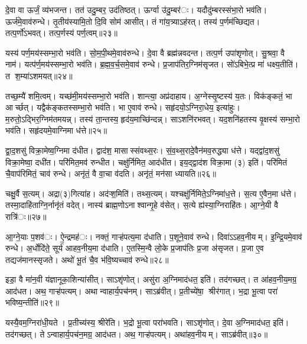 दे॒वा वा ऊर्जं॒ व्य॑भजन्त। तत॑ उदु॒म्बर॒ उद॑तिष्ठत्। ऊर्ग्वा उ॑दु॒म्बर॑ः। यदौदु॑म्बरस्संभा॒रो भव॑ति। ऊर्ज॑मे॒वाव॑रुन्धे। तृ॒तीय॑स्यामि॒तो दि॒वि सोम॑ आसीत्। तं गा॑य॒त्र्याऽह॑रत्। तस्य॑ प॒र्णम॑च्छिद्यत। तत्प॒र्णो॑ऽभवत्। तत्प॒र्णस्य॑ पर्ण॒त्वम्॥२३॥

यस्य॑ पर्ण॒मय॑स्सम्भा॒रो भव॑ति। सो॒म॒पी॒थमे॒वाव॑रुन्धे। दे॒वा वै ब्रह्म॑न्नवदन्त। तत्प॒र्ण उपा॑शृणोत्। सु॒श्रवा॒ वै नाम॑। यत्प॑र्ण॒मय॑स्सम्भा॒रो भव॑ति। ब्र॒ह्म॒व॒र्च॒समे॒वाव॑ रुन्धे। प्र॒जाप॑तिर॒ग्निम॑सृजत। सो॑ऽबिभे॒त्प्र मा॑ धक्ष्य॒तीति॑। त श॒म्या॑ऽशमयत्॥२४॥

तच्छ॒म्यै॑ शमि॒त्वम्। यच्छ॑मी॒मय॑स्सम्भा॒रो भव॑ति। शान्त्या॒ अप्र॑दाहाय। अ॒ग्नेस्सृ॒ष्टस्य॑ य॒तः। विक॑ङ्कतं॒ भा आर्च्छत्। यद्वैक॑ङ्कतस्सम्भा॒रो भव॑ति। भा ए॒वाव॑ रुन्धे। सहृ॑दयो॒ऽग्निरा॒धेय॒ इत्या॑हुः। म॒रुतो॒ऽद्भिर॒ग्निम॑तमयन्न्। तस्य॑ ता॒न्तस्य॒ हृद॑य॒माच्छि॑न्दन्न्। साऽशनि॑रभवत्। यद॒शनि॑हतस्य वृ॒क्षस्य॑ सम्भा॒रो भव॑ति। सहृ॑दयमे॒वाग्निमा ध॑त्ते॥२५॥

द्वा॒द॒शसु॑ विक्रा॒मेष्व॒ग्निमा द॑धीत। द्वाद॑श॒ मासास्संवथ्स॒रः। सं॒व॒थ्स॒रादे॒वैन॑मव॒रुद्ध्या ध॑त्ते। यद्द्वा॑द॒शसु॑ विक्रा॒मेष्वा॒ दधी॑त। परि॑मित॒मव॑ रुन्धीत। चक्षु॑र्निमित॒ आद॑धीत। इय॒द्द्वाद॑श विक्रा॒मा (३) इति॑। परि॑मितं चै॒वाप॑रिमितं॒ चाव॑ रुन्धे। अनृ॑तं॒ वै वा॒चा व॑दति। अनृ॑तं॒ मन॑सा ध्यायति॥२६॥

चक्षु॒र्वै स॒त्यम्। अद्रा(३)गित्या॑ह। अद॑ऱ्श॒मिति॑। तथ्स॒त्यम्। यश्चक्षु॑र्निमिते॒ऽग्निमा॑ध॒त्ते। स॒त्य ए॒वैन॒मा ध॑त्ते। तस्मा॒दाहि॑ताग्नि॒र्नानृ॑तं वदेत्। नास्य॑ ब्राह्म॒णोऽनाश्वान्गृ॒हे व॑सेत्। स॒त्ये ह्य॑स्या॒ग्निराहि॑तः। आ॒ग्ने॒यी वै रात्रि॑ः॥२७॥

आ॒ग्ने॒याः प॒शव॑ः। ऐ॒न्द्रमह॑ः। नक्तं॒ गाऱ्ह॑पत्य॒मा द॑धाति। प॒शूने॒वाव॑ रुन्धे। दिवा॑ऽऽहव॒नीयम्। इ॒न्द्रि॒यमे॒वाव॑ रुन्धे। अ॒र्धोदि॑ते॒ सूर्य॑ आहव॒नीय॒मा द॑धाति। ए॒तस्मि॒न्वै लो॒के प्र॒जाप॑तिः प्र॒जा अ॑सृजत। प्र॒जा ए॒व तद्यज॑मानस्सृजते। अथो॑ भू॒तं चै॒व भ॑वि॒ष्यच्चाव॑ रुन्धे॥२८॥

इडा॒ वै मा॑न॒वी य॑ज्ञानूका॒शिन्या॑सीत्। साऽशृ॑णोत्। असु॑रा अ॒ग्निमाद॑धत॒ इति॑। तद॑गच्छत्। त आ॑हव॒नीय॒मग्र॒ आद॑धत। अथ॒ गाऱ्ह॑पत्यम्। अथान्वाहार्य॒पच॑नम्। साऽब्र॑वीत्। प्र॒तीच्ये॑षा॒ श्रीर॑गात्। भ॒द्रा भू॒त्वा परा॑ भविष्य॒न्तीति॑॥२९॥

यस्यै॒वम॒ग्निरा॑धी॒यते। प्र॒तीच्य॑स्य॒ श्रीरे॑ति। भ॒द्रो भू॒त्वा परा॑भवति। साऽशृ॑णोत्। दे॒वा अ॒ग्निमाद॑धत॒ इति॑। तद॑गच्छत्। तेऽन्वाहार्य॒पच॑न॒मग्र॒ आद॑धत। अथ॒ गाऱ्ह॑पत्यम्। अथा॑हव॒नीयम्। साऽब्र॑वीत्॥३०॥

